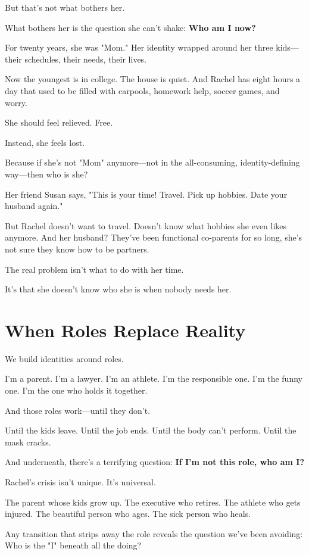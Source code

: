 \documentclass[11pt,twoside]{book}
\begin{document}
But that's not what bothers her.

What bothers her is the question she can't shake: \textbf{Who am I now?}

For twenty years, she was "Mom." Her identity wrapped around her three kids—their schedules, their needs, their lives.

Now the youngest is in college. The house is quiet. And Rachel has eight hours a day that used to be filled with carpools, homework help, soccer games, and worry.

She should feel relieved. Free.

Instead, she feels lost.

Because if she's not "Mom" anymore—not in the all-consuming, identity-defining way—then who is she?

Her friend Susan says, "This is your time! Travel. Pick up hobbies. Date your husband again."

But Rachel doesn't want to travel. Doesn't know what hobbies she even likes anymore. And her husband? They've been functional co-parents for so long, she's not sure they know how to be partners.

The real problem isn't what to do with her time.

It's that she doesn't know who she is when nobody needs her.

\section*{When Roles Replace Reality}

We build identities around roles.

I'm a parent. I'm a lawyer. I'm an athlete. I'm the responsible one. I'm the funny one. I'm the one who holds it together.

And those roles work—until they don't.

Until the kids leave. Until the job ends. Until the body can't perform. Until the mask cracks.

And underneath, there's a terrifying question: \textbf{If I'm not this role, who am I?}

Rachel's crisis isn't unique. It's universal.

The parent whose kids grow up. The executive who retires. The athlete who gets injured. The beautiful person who ages. The sick person who heals.

Any transition that strips away the role reveals the question we've been avoiding: Who is the "I" beneath all the doing?
\end{document}
